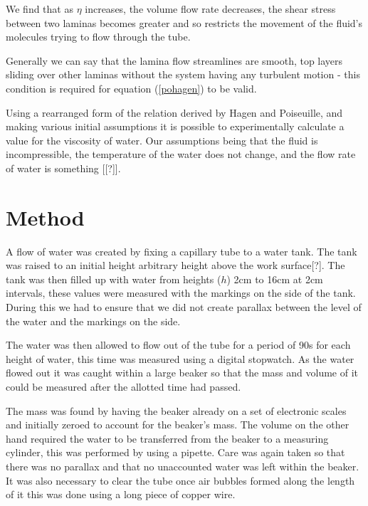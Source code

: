 \documentclass[twocolumn]{revtex4}
\begin{document}
We find that as $\eta$ increases, the volume flow rate decreases, the shear stress between two laminas becomes greater and so restricts the movement of the fluid's molecules trying to flow through the tube. 

Generally we can say that the lamina flow streamlines are smooth, top layers sliding over other laminas without the system having any turbulent motion - this condition is required for equation (\ref{pohagen}) to be valid. 

Using a rearranged form of the relation derived by Hagen and Poiseuille, and making various initial assumptions it is possible to experimentally calculate a value for the viscosity of water. Our assumptions being that the fluid is incompressible, the temperature of the water does not change, and the flow rate of water is something [[?]].

\vspace{-3ex}
\section{Method} 
\vspace{-2ex}
A flow of water was created by fixing a capillary tube to a water tank. The tank was raised to an initial height arbitrary height above the work surface[?]. The tank was then filled up with water from heights ($h$) 2cm to 16cm at 2cm intervals, these values were measured with the markings on the side of the tank. During this we had to ensure that we did not create parallax between the level of the water and the markings on the side. 

The water was then allowed to flow out of the tube for a period of 90s for each height of water, this time was measured using a digital stopwatch. As the water flowed out it was caught within a large beaker so that the mass and volume of it could be measured after the allotted time had passed. 

The mass was found by having the beaker already on a set of electronic scales and initially zeroed to account for the beaker's mass. The volume on the other hand required the water to be transferred from the beaker to a measuring cylinder, this was performed by using a pipette. Care was again taken so that there was no parallax and that no unaccounted water was left within the beaker. It was also necessary to clear the tube once air bubbles formed along the length of it this was done using a long piece of copper wire. 
\end{document}
